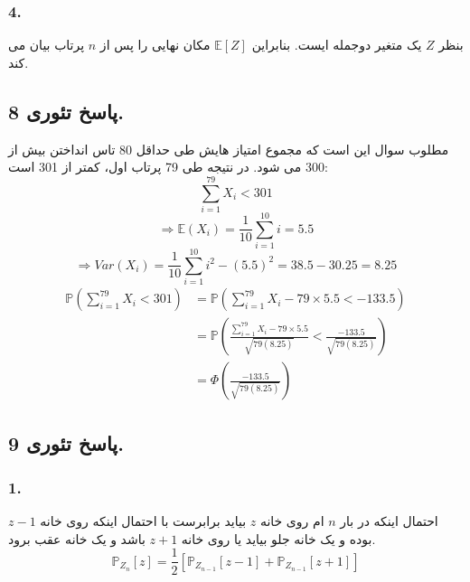 \documentclass[]{article}
\begin{document}
	\subsubsection{4.}
	بنظر 
	$Z$
	یک متغیر دوجمله ایست. بنابراین 
	$\mathbb{E}[Z]$
	مکان نهایی را پس از $n$ پرتاب بیان می کند.
	\newpage
	\subsection{پاسخ تئوری 8.}
	مطلوب سوال این است که مجموع امتیاز هایش طی حداقل 80 تاس انداختن بیش از 300 می شود. در نتیجه طی 79 پرتاب اول، کمتر از 301 است:
	\begin{equation}
		\nonumber
		\sum_{i=1}^{79} X_i < 301
	\end{equation}
	\begin{equation}
		\nonumber
		\Rightarrow \mathbb{E}(X_i) = \frac{1}{10} \sum_{i=1}^{10} i = 5.5
	\end{equation}
	\begin{equation}
		\nonumber
		\Rightarrow Var(X_i) = \frac{1}{10} \sum_{i=1}^{10} i^2 - (5.5)^2 = 38.5 - 30.25 = 8.25
	\end{equation}
	\begin{equation}
		\nonumber
		\begin{split}
			\mathbb{P}(\sum_{i=1}^{79}X_i < 301) &= \mathbb{P}(\sum_{i=1}^{79}X_i - 79 \times 5.5 < -133.5)\\
			&=\mathbb{P}(\frac{\sum_{i=1}^{79}X_i - 79 \times 5.5}{\sqrt{79(8.25)}} < \frac{-133.5}{\sqrt{79(8.25)}})\\
			&= \Phi(\frac{-133.5}{\sqrt{79(8.25)}})			
		\end{split}
	\end{equation}
	\newpage
	\subsection{پاسخ تئوری 9.}
	\subsubsection{1.}
	احتمال اینکه در بار $n$ ام روی خانه $z$ بیاید برابرست با احتمال اینکه روی خانه $z-1$ بوده و یک خانه جلو بیاید یا روی خانه $z+1$ باشد و یک خانه عقب برود.
	\begin{equation}
		\nonumber
		\mathbb{P}_{Z_n}[z] = \frac{1}{2} [\mathbb{P}_{Z_{n-1}}[z-1] + \mathbb{P}_{Z_{n-1}}[z+1]]
	\end{equation}
\end{document}
